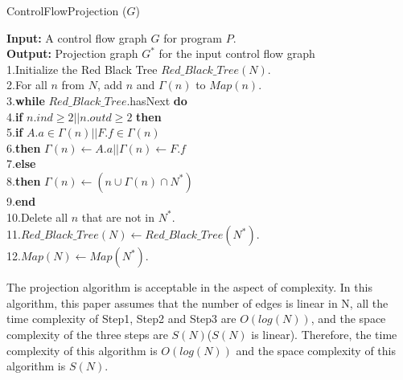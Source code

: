 \begin{algorithm}
\caption{ControlFlowProjection ($G$)}\label{alg:cfp}
\textbf{Input:} A control flow graph $G$ for program $P$.\\
\textbf{Output:} Projection graph $G^*$ for the input control flow graph\\
1.\quad	Initialize the Red Black Tree $\mathit{Red\_Black\_Tree}(N)$.\\
2.\quad	For all $n$ from $N$, add $n$ and $\Gamma(n)$ to $\mathit{Map}(n)$.\\
3.\quad	\textbf{while} $\mathit{Red\_Black\_Tree}$.hasNext \textbf{do}\\
4.\quad	\textbf{if} $n.ind\geq 2 || n.outd\geq 2$ \textbf{then}\\
5.\quad \quad    \textbf{if} $A.a\in \Gamma(n) || F.f\in \Gamma(n)$\\
6.\quad \quad	    \textbf{then} $\Gamma(n)\leftarrow A.a || \Gamma(n)\leftarrow F.f$\\
7.\quad	\textbf{else} \\
8.\quad \quad   \textbf{then} $\Gamma(n)\leftarrow (n\cup \Gamma(n)\cap N^*)$\\
9.\quad\textbf{end}\\
10.\quad	Delete all $n$ that are not in $N^*$.\\
11.\quad	$\mathit{Red\_Black\_Tree(N)} \leftarrow \mathit{Red\_Black\_Tree}(N^*)$.\\
12.\quad	$\mathit{Map}(N) \leftarrow \mathit{Map}(N^*)$.\\
\end{algorithm}

The projection algorithm is acceptable in the aspect of complexity. In this algorithm, this paper assumes that the number of edges is linear in N, all the time complexity of Step1, Step2 and Step3 are $O(log(N))$, and the space complexity of the three steps are $S(N)$($S(N)$ is linear). Therefore, the time complexity of this algorithm is $O(log(N))$ and the space complexity of this algorithm is $S(N)$.

